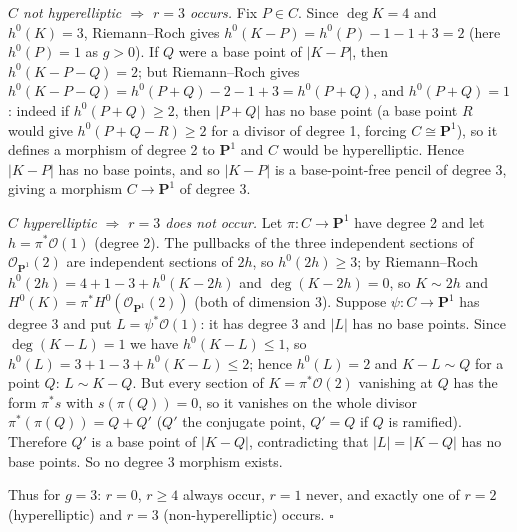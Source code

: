 \documentclass[11pt]{article}
\begin{document}
\emph{$C$ not hyperelliptic $\Rightarrow$ $r=3$ occurs.} Fix $P\in C$. Since $\deg K=4$ and $h^0(K)=3$, Riemann--Roch gives $h^0(K-P)=h^0(P)-1-1+3=2$ (here $h^0(P)=1$ as $g>0$). If $Q$ were a base point of $|K-P|$, then $h^0(K-P-Q)=2$; but Riemann--Roch gives $h^0(K-P-Q)=h^0(P+Q)-2-1+3=h^0(P+Q)$, and $h^0(P+Q)=1$: indeed if $h^0(P+Q)\ge2$, then $|P+Q|$ has no base point (a base point $R$ would give $h^0(P+Q-R)\ge2$ for a divisor of degree 1, forcing $C\cong\mathbf P^1$), so it defines a morphism of degree 2 to $\mathbf P^1$ and $C$ would be hyperelliptic. Hence $|K-P|$ has no base points, and so $|K-P|$ is a base-point-free pencil of degree $3$, giving a morphism $C\to\mathbf P^1$ of degree $3$.

\emph{$C$ hyperelliptic $\Rightarrow$ $r=3$ does not occur.} Let $\pi\colon C\to\mathbf P^1$ have degree 2 and let $h=\pi^*\mathcal O(1)$ (degree 2). The pullbacks of the three independent sections of $\mathcal O_{\mathbf P^1}(2)$ are independent sections of $2h$, so $h^0(2h)\ge3$; by Riemann--Roch $h^0(2h)=4+1-3+h^0(K-2h)$ and $\deg(K-2h)=0$, so $K\sim2h$ and $H^0(K)=\pi^*H^0(\mathcal O_{\mathbf P^1}(2))$ (both of dimension 3). Suppose $\psi\colon C\to\mathbf P^1$ has degree 3 and put $L=\psi^*\mathcal O(1)$: it has degree 3 and $|L|$ has no base points. Since $\deg(K-L)=1$ we have $h^0(K-L)\le1$, so $h^0(L)=3+1-3+h^0(K-L)\le2$; hence $h^0(L)=2$ and $K-L\sim Q$ for a point $Q$: $L\sim K-Q$. But every section of $K=\pi^*\mathcal O(2)$ vanishing at $Q$ has the form $\pi^*s$ with $s(\pi(Q))=0$, so it vanishes on the whole divisor $\pi^*(\pi(Q))=Q+Q'$ ($Q'$ the conjugate point, $Q'=Q$ if $Q$ is ramified). Therefore $Q'$ is a base point of $|K-Q|$, contradicting that $|L|=|K-Q|$ has no base points. So no degree $3$ morphism exists.

Thus for $g=3$: $r=0$, $r\ge4$ always occur, $r=1$ never, and exactly one of $r=2$ (hyperelliptic) and $r=3$ (non-hyperelliptic) occurs. \hfill$\square$
\end{document}
